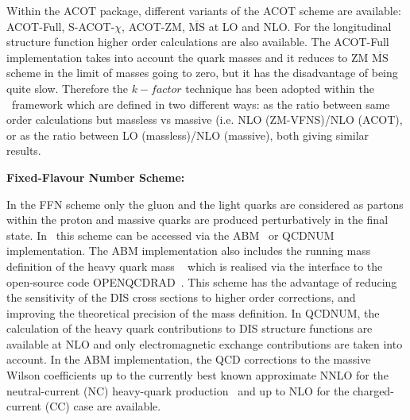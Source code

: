 \begin{description}
Within the ACOT package, different variants of the ACOT scheme are available:
ACOT-Full, S-ACOT-$\chi$, ACOT-ZM, $\overline{\text{MS}}$ at LO and NLO. 
For the longitudinal structure function higher order calculations are also available. 
The ACOT-Full implementation takes into account the quark masses 
and it reduces to ZM $\overline{\text{MS}}$ scheme in the limit of masses going to zero, 
but it has the disadvantage of being quite slow.
Therefore the $k-factor$ technique has been adopted within the \fitter\ framework which are  
defined in two different ways:
as the ratio between same order calculations but massless vs massive 
(i.e. NLO (ZM-VFNS)/NLO (ACOT), or as the ratio between LO (massless)/NLO (massive),
both giving similar results.
%
%
%
\vspace{0.1cm}
\item \bf {Fixed-Flavour Number Scheme:} \rm

In the FFN scheme only the gluon and the light quarks are considered
as partons within the proton and massive quarks are produced perturbatively in the final state.
In \fitter\ this scheme can be accessed via the ABM~\cite{openqcdrad:page} or
QCDNUM implementation.
The ABM implementation also includes the running mass definition of the heavy quark 
mass ~\cite{Alekhin:runm} which is realised via the interface to the 
open-source code OPENQCDRAD~\cite{openqcdrad:page}.
This scheme has the advantage of reducing the sensitivity of the DIS cross sections to
higher order corrections, and improving the theoretical precision of the mass definition. 
In QCDNUM, the calculation of the heavy quark contributions to DIS structure functions
are available at NLO and only electromagnetic exchange contributions are taken into account.
In the ABM implementation, the QCD corrections to the massive Wilson coefficients 
up to the currently best known approximate NNLO for the neutral-current (NC) 
heavy-quark production~\cite{SMoch:npb864} and up to NLO
for the charged-current (CC) case are available.
\end{description}


